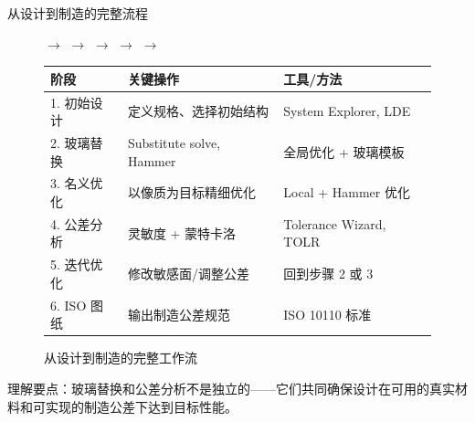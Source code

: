 \begin{frame}{从设计到制造的完整流程}
    \begin{figure}
        \centering
        \hspace{0.5em}
        $\longrightarrow$\hspace{0.5em}
        \hspace{0.5em}
        $\longrightarrow$\hspace{0.5em}
        \hspace{0.5em}
        $\longrightarrow$\hspace{0.5em}
        \hspace{0.5em}
        $\longrightarrow$\hspace{0.5em}
        \hspace{0.5em}
        $\longrightarrow$\hspace{0.5em}

        \bigbreak
        \renewcommand{\arraystretch}{1.8}
        \begin{tabular}{p{3cm}|p{4cm}|p{4cm}}
            \toprule
            \textbf{阶段} & \textbf{关键操作} & \textbf{工具/方法} \\
            \midrule
            1. 初始设计  & 定义规格、选择初始结构   & System Explorer, LDE \\
            2. 玻璃替换  & Substitute solve, Hammer & 全局优化 + 玻璃模板 \\
            3. 名义优化  & 以像质为目标精细优化      & Local + Hammer 优化 \\
            4. 公差分析  & 灵敏度 + 蒙特卡洛        & Tolerance Wizard, TOLR \\
            5. 迭代优化  & 修改敏感面/调整公差      & 回到步骤 2 或 3 \\
            6. ISO 图纸  & 输出制造公差规范         & ISO 10110 标准 \\
            \bottomrule
        \end{tabular}
        \caption{从设计到制造的完整工作流}
        \label{tab:design_to_manufacturing_workflow}
    \end{figure}

    \alert{理解要点：}玻璃替换和公差分析不是独立的——它们共同确保设计在\alert{可用的真实材料}和\alert{可实现的制造公差}下达到目标性能。
\end{frame}

